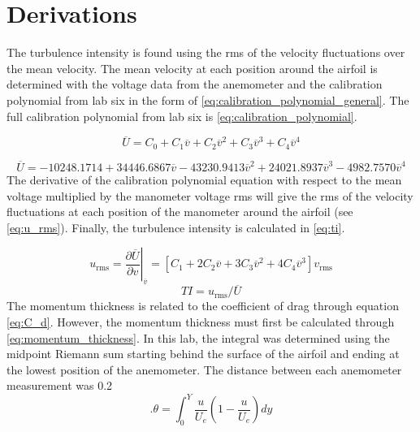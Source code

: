 \section{Derivations}\label{sec:derivations}

The turbulence intensity is found using the \acrfull{rms} of the velocity fluctuations over the mean velocity. \citep{lab7-manual} The mean velocity at each position around the airfoil is determined with the voltage data from the anemometer and the calibration polynomial from lab six in the form of \autoref{eq:calibration_polynomial_general}. The full calibration polynomial from lab six is \autoref{eq:calibration_polynomial}.

\begin{equation} \label{eq:calibration_polynomial_general}
    \overline{U} = C_0 + C_1\overline{v} + C_2\overline{v}^2 + C_3\overline{v}^3 + C_4\overline{v}^4
\end{equation}

\begin{equation} \label{eq:calibration_polynomial}
    \overline{U} = \num{-10248.1714} + \num{34446.6867}\overline{v} - \num{43230.9413}\overline{v}^2 + \num{24021.8937}\overline{v}^3 - \num{4982.7570}\overline{v}^4
\end{equation}
The derivative of the calibration polynomial equation with respect to the mean voltage multiplied by the manometer voltage \acrshort{rms} will give the \acrshort{rms} of the velocity fluctuations at each position of the manometer around the airfoil (see \autoref{eq:u_rms}). Finally, the turbulence intensity is calculated in \autoref{eq:ti}.

\begin{equation} \label{eq:u_rms}
    u_\text{rms} = \left. \frac{\partial \overline{U}}{\partial v}\right|_{\overline{v}} = \left[C_1 + 2C_2\overline{v} + 3C_3\overline{v}^2 + 4C_4\overline{v}^3\right]v_\text{rms}
\end{equation}
\begin{equation}\label{eq:ti}
    TI = u_\text{rms} / \overline{U}
\end{equation}
The momentum thickness is related to the coefficient of drag through equation \autoref{eq:C_d}. However, the momentum thickness must first be calculated through \autoref{eq:momentum_thickness}. In this lab, the integral was determined using the midpoint Riemann sum starting behind the surface of the airfoil and ending at the lowest position of the anemometer. The distance between each anemometer measurement was \num{0.2}\unit{}
\begin{equation} \label{eq:momentum_thickness}. 
    \theta = \int_0^Y\frac{u}{U_e}\left(1 - \frac{u}{U_e}\right)dy
\end{equation}

